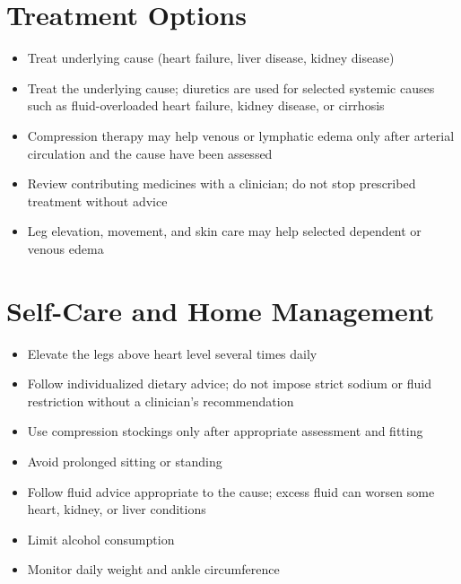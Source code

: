 \section*{Treatment Options}
\begin{itemize}
\item Treat underlying cause (heart failure, liver disease, kidney disease)
\item Treat the underlying cause; diuretics are used for selected systemic causes such as fluid-overloaded heart failure, kidney disease, or cirrhosis
\item Compression therapy may help venous or lymphatic edema only after arterial circulation and the cause have been assessed
\item Review contributing medicines with a clinician; do not stop prescribed treatment without advice
\item Leg elevation, movement, and skin care may help selected dependent or venous edema
\end{itemize}

\section*{Self-Care and Home Management}
\begin{itemize}
\item Elevate the legs above heart level several times daily
\item Follow individualized dietary advice; do not impose strict sodium or fluid restriction without a clinician's recommendation
\item Use compression stockings only after appropriate assessment and fitting
\item Avoid prolonged sitting or standing
\item Follow fluid advice appropriate to the cause; excess fluid can worsen some heart, kidney, or liver conditions
\item Limit alcohol consumption
\item Monitor daily weight and ankle circumference
\end{itemize}

